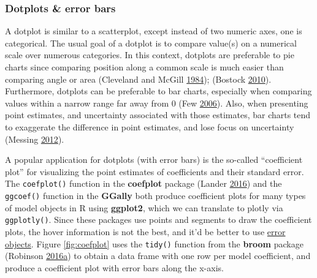 \documentclass[12pt,]{isuthesis}
\begin{document}
\subsubsection{Dotplots \& error bars}\label{dotplots-error-bars}

A dotplot is similar to a scatterplot, except instead of two numeric
axes, one is categorical. The usual goal of a dotplot is to compare
value(s) on a numerical scale over numerous categories. In this context,
dotplots are preferable to pie charts since comparing position along a
common scale is much easier than comparing angle or area (Cleveland and
McGill \protect\hyperlink{ref-graphical-perception}{1984}); (Bostock
\protect\hyperlink{ref-crowdsourcing-graphical-perception}{2010}).
Furthermore, dotplots can be preferable to bar charts, especially when
comparing values within a narrow range far away from 0 (Few
\protect\hyperlink{ref-few-values}{2006}). Also, when presenting point
estimates, and uncertainty associated with those estimates, bar charts
tend to exaggerate the difference in point estimates, and lose focus on
uncertainty (Messing \protect\hyperlink{ref-messing}{2012}).

A popular application for dotplots (with error bars) is the so-called
``coefficient plot'' for visualizing the point estimates of coefficients
and their standard error. The \texttt{coefplot()} function in the
\textbf{coefplot} package (Lander
\protect\hyperlink{ref-coefplot}{2016}) and the \texttt{ggcoef()}
function in the \textbf{GGally} both produce coefficient plots for many
types of model objects in R using \textbf{ggplot2}, which we can
translate to plotly via \texttt{ggplotly()}. Since these packages use
points and segments to draw the coefficient plots, the hover information
is not the best, and it'd be better to use
\href{https://plot.ly/r/reference/\#scatter-error_x}{error objects}.
Figure \ref{fig:coefplot} uses the \texttt{tidy()} function from the
\textbf{broom} package (Robinson
\protect\hyperlink{ref-broom}{2016}\protect\hyperlink{ref-broom}{a}) to
obtain a data frame with one row per model coefficient, and produce a
coefficient plot with error bars along the x-axis.
\end{document}
